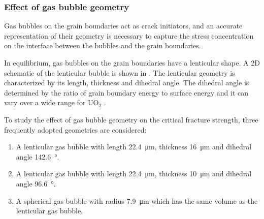 \subsubsection{Effect of gas bubble geometry}

Gas bubbles on the grain boundaries act as crack initiators, and an accurate representation of their geometry is necessary to capture the stress concentration on the interface between the bubbles and the grain boundaries.

In equilibrium, gas bubbles on the grain boundaries have a lenticular shape. A 2D schematic of the lenticular bubble is shown in . The lenticular geometry is characterized by its length, thickness and dihedral angle. The dihedral angle is determined by the ratio of grain boundary energy to surface energy and it can vary over a wide range for UO$_2$ \cite{HODKIN19807,REYNOLDS1971112}.

To study the effect of gas bubble geometry on the critical fracture strength, three frequently adopted geometries are considered:
\begin{enumerate}[label=(\roman*)]
  \item A lenticular gas bubble with length \SI{22.4}{\micro\meter}, thickness \SI{16}{\micro\meter} and dihedral angle \SI{142.6}{\degree}.
  \item A lenticular gas bubble with length \SI{22.4}{\micro\meter}, thickness \SI{10}{\micro\meter} and dihedral angle \SI{96.6}{\degree}.
  \item A spherical gas bubble with radius \SI{7.9}{\micro\meter} which has the same volume as the lenticular gas bubble.
\end{enumerate}

